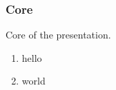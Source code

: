 \begin{frame}
	\frametitle{Core}
	
	Core of the presentation.
	
	\begin{enumerate}
		\item hello
		\item world
	\end{enumerate}
\end{frame}
